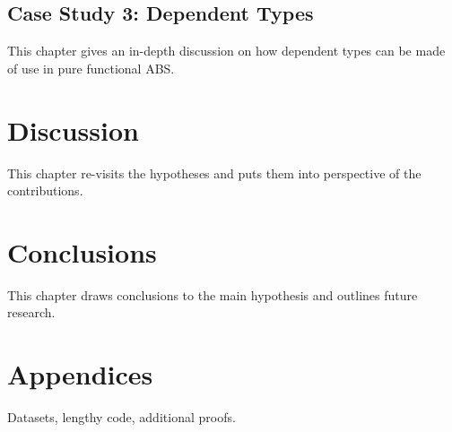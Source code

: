 %

\subsection{Case Study 3: Dependent Types}
This chapter gives an in-depth discussion on how dependent types can be made of use in pure functional ABS.

\section{Discussion}
This chapter re-visits the hypotheses and puts them into perspective of the contributions.

\section{Conclusions}
This chapter draws conclusions to the main hypothesis and outlines future research.

\section{Appendices}
Datasets, lengthy code, additional proofs.
